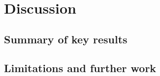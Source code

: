 %
\section{Discussion}

\subsection{Summary of key results}


\subsection{Limitations and further work}

